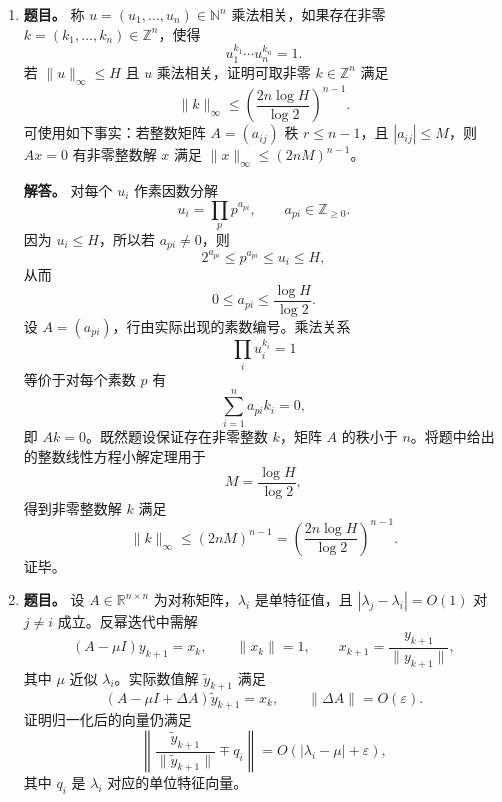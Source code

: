 ﻿\documentclass[UTF8,12pt]{ctexart}
\begin{document}
\begin{enumerate}[label=\textbf{\arabic*.},leftmargin=2.2em]
\textbf{解答。} 由质量作用律，
\[
\frac{dS}{dT}=-k_1SE+k_2C,
\quad
\frac{dE}{dT}=-k_1SE+(k_2+k_3)C,
\]
\[
\frac{dC}{dT}=k_1SE-(k_2+k_3)C,
\quad
\frac{dP}{dT}=k_3C.
\]
无量纲化并用点表示对 \(t\) 求导，得
\[
\dot s=-se+\lambda c,
\quad
\varepsilon\dot e=-se+\mu c,
\quad
\varepsilon\dot c=se-\mu c,
\quad
\dot p=(\mu-\lambda)c.
\]
又总酶量守恒给出
\[
e+c=1.
\]
令 \(\varepsilon\to0\)，快方程退化为代数约束
\[
s_0e_0=\mu c_0,
\qquad e_0+c_0=1.
\]
解得
\[
c_0=\frac{s_0}{\mu+s_0},
\qquad
 e_0=\frac{\mu}{\mu+s_0}.
\]
于是
\[
\dot s_0=-s_0e_0+\lambda c_0
=-\frac{\mu s_0}{\mu+s_0}+\frac{\lambda s_0}{\mu+s_0}
=-(\mu-\lambda)\frac{s_0}{\mu+s_0},
\]
并且
\[
\dot p_0=(\mu-\lambda)c_0=(\mu-\lambda)\frac{s_0}{\mu+s_0}.
\]
这正是题目要求的 Michaelis--Menten 慢方程。

\item \textbf{题目。} 称 \(u=(u_1,\ldots,u_n)\in\mathbb N^n\) 乘法相关，如果存在非零 \(k=(k_1,\ldots,k_n)\in\mathbb Z^n\)，使得
\[
u_1^{k_1}\cdots u_n^{k_n}=1.
\]
若 \(\|u\|_\infty\le H\) 且 \(u\) 乘法相关，证明可取非零 \(k\in\mathbb Z^n\) 满足
\[
\|k\|_\infty\le
\left(\frac{2n\log H}{\log2}\right)^{n-1}.
\]
可使用如下事实：若整数矩阵 \(A=(a_{ij})\) 秩 \(r\le n-1\)，且 \(|a_{ij}|\le M\)，则 \(Ax=0\) 有非零整数解 \(x\) 满足 \(\|x\|_\infty\le(2nM)^{n-1}\)。

\textbf{解答。} 对每个 \(u_i\) 作素因数分解
\[
u_i=\prod_{p}p^{a_{pi}},
\qquad a_{pi}\in\mathbb Z_{\ge0}.
\]
因为 \(u_i\le H\)，所以若 \(a_{pi}\ne0\)，则
\[
2^{a_{pi}}\le p^{a_{pi}}\le u_i\le H,
\]
从而
\[
0\le a_{pi}\le \frac{\log H}{\log2}.
\]
设 \(A=(a_{pi})\)，行由实际出现的素数编号。乘法关系
\[
\prod_i u_i^{k_i}=1
\]
等价于对每个素数 \(p\) 有
\[
\sum_{i=1}^n a_{pi}k_i=0,
\]
即 \(Ak=0\)。既然题设保证存在非零整数 \(k\)，矩阵 \(A\) 的秩小于 \(n\)。将题中给出的整数线性方程小解定理用于
\[
M=\frac{\log H}{\log2},
\]
得到非零整数解 \(k\) 满足
\[
\|k\|_\infty\le(2nM)^{n-1}
=\left(\frac{2n\log H}{\log2}\right)^{n-1}.
\]
证毕。

\item \textbf{题目。} 设 \(A\in\mathbb R^{n\times n}\) 为对称矩阵，\(\lambda_i\) 是单特征值，且 \(|\lambda_j-\lambda_i|=O(1)\) 对 \(j\ne i\) 成立。反幂迭代中需解
\[
(A-\mu I)y_{k+1}=x_k,
\qquad \|x_k\|=1,
\qquad x_{k+1}=\frac{y_{k+1}}{\|y_{k+1}\|},
\]
其中 \(\mu\) 近似 \(\lambda_i\)。实际数值解 \(\tilde y_{k+1}\) 满足
\[
(A-\mu I+\Delta A)\tilde y_{k+1}=x_k,
\qquad \|\Delta A\|=O(\varepsilon).
\]
证明归一化后的向量仍满足
\[
\left\|\frac{\tilde y_{k+1}}{\|\tilde y_{k+1}\|}\mp q_i\right\|
=O(|\lambda_i-
\mu|+\varepsilon),
\]
其中 \(q_i\) 是 \(\lambda_i\) 对应的单位特征向量。


\end{enumerate}
\end{document}
